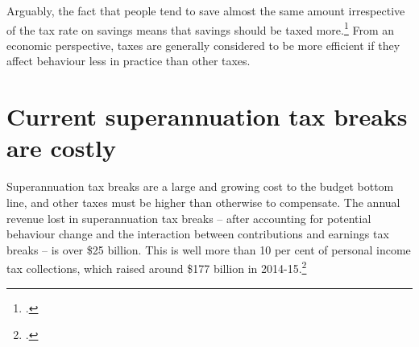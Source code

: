 Arguably, the fact that people tend to save almost the same amount irrespective of the tax rate on savings means that savings should be taxed more.\footcite[][21]{Ingles2015}  From an economic perspective, taxes are generally considered to be more efficient if they affect behaviour less in practice than other taxes.

\section{Current superannuation tax breaks are costly}\label{sec:SUPER-2-8}
Superannuation tax breaks are a large and growing cost to the budget bottom line, and other taxes must be higher than otherwise to compensate. The annual revenue lost in superannuation tax breaks – after accounting for potential behaviour change and the interaction between contributions and earnings tax breaks – is over \$25 billion.%
\label{fn:81} 
This is well more than 10 per cent of personal income tax collections, which raised around \$177 billion in 2014-15.\footcite[][4--14]{Treasury2015BudgetPapers201516}

